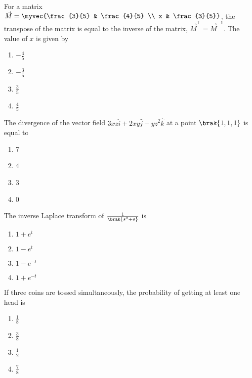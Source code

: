 \iffalse
\chapter{2009}
\author{AI24BTECH11031}
\section{me}
\fi

\item For a matrix $\vec{M} = \myvec{\frac{3}{5} & \frac{4}{5} \\ x & \frac{3}{5}}$,
the transpose of the matrix is equal to the inverse of the matrix, $\vec{M}^\top = \vec{M}^{-1}$.
The value of $x$ is given by
\begin{multicols}{4}
\begin{enumerate}
    \item $-\frac{4}{5}$
    \item $-\frac{3}{5}$
    \item $\frac{3}{5}$
    \item $\frac{4}{5}$
\end{enumerate}
\end{multicols}

\item The divergence of the vector field $3xz\hat{i} + 2xy\hat{j} - yz^2\hat{k}$
at a point $\brak{1, 1, 1}$ is equal to
\begin{multicols}{4}
\begin{enumerate}
    \item 7
    \item 4
    \item 3
    \item 0
\end{enumerate}
\end{multicols}

\item The inverse Laplace transform of $\frac{1}{\brak{s^2 + s}}$ is
\begin{multicols}{4}
\begin{enumerate}
    \item $1 + e^t$
    \item $1 - e^t$
    \item $1 - e^{-t}$
    \item $1 + e^{-t}$
\end{enumerate}
\end{multicols}

\item If three coins are tossed simultaneously, the probability of getting at
least one head is
\begin{multicols}{4}
\begin{enumerate}
    \item $\frac{1}{8}$
    \item $\frac{3}{8}$
    \item $\frac{1}{2}$
    \item $\frac{7}{8}$
\end{enumerate}
\end{multicols}

